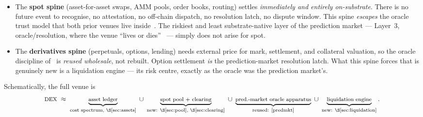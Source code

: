 \documentclass[11pt]{article}
\theoremstyle{definition}
\begin{document}
\begin{itemize}[leftmargin=1.4em]
\item The \textbf{spot spine} (asset-for-asset swaps, AMM pools, order books, routing) settles
\emph{immediately and entirely on-substrate}. There is no future event to recognise, no
attestation, no off-chain dispatch, no resolution latch, no dispute window. This spine
\emph{escapes} the oracle trust model that both prior venues live inside~\cite[\S8.5]{ppf}. The
riskiest and least substrate-native layer of the prediction market --- Layer~3, oracle/resolution,
where the venue ``lives or dies''~\cite[\S3]{predmkt} --- simply does not arise for spot.
\item The \textbf{derivatives spine} (perpetuals, options, lending) needs external price for
mark, settlement, and collateral valuation, so the oracle discipline of~\cite[\S4]{predmkt} is
\emph{reused wholesale}, not rebuilt. Option settlement \emph{is} the prediction-market resolution
latch. What this spine forces that is genuinely new is a liquidation engine --- its risk centre,
exactly as the oracle was the prediction market's.
\end{itemize}

Schematically, the full venue is
\[
\footnotesize
\text{DEX} \;\approx\;
\underbrace{\text{asset ledger}}_{\text{cost spectrum, \S\ref{sec:assets}}}
\;\cup\;
\underbrace{\text{spot pool + clearing}}_{\text{new: \S\ref{sec:pool},\ \S\ref{sec:clearing}}}
\;\cup\;
\underbrace{\text{pred.-market oracle apparatus}}_{\text{reused: \cite{predmkt}}}
\;\cup\;
\underbrace{\text{liquidation engine}}_{\text{new: \S\ref{sec:liquidation}}} .
\]
\end{document}
